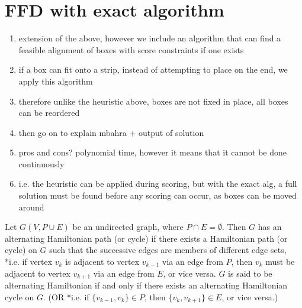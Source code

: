 \documentclass{llncs}
\begin{document}
\section{FFD with exact algorithm}
\begin{enumerate}
	\item extension of the above, however we include an algorithm that can find a feasible alignment of boxes with score constraints if one exists
	\item if a box can fit onto a strip, instead of attempting to place on the end, we apply this algorithm
	\item therefore unlike the heuristic above, boxes are not fixed in place, all boxes can be reordered
	\item then go on to explain mbahra + output of solution
	\item pros and cons? polynomial time, however it means that it cannot be done continuously
	\item i.e. the heuristic can be applied during scoring, but with the exact alg, a full solution must be found before any scoring can occur, as boxes can be moved around
\end{enumerate}

\begin{definition}
	Let $G(V,P\cup E)$ be an undirected graph, where $P \cap E = \emptyset$. Then $G$ has an alternating Hamiltonian path (or cycle) if there exists a Hamiltonian path (or cycle) on $G$ such that the successive edges are members of different edge sets, *i.e. if vertex $v_k$ is adjacent to vertex $v_{k-1}$ via an edge from $P$, then $v_k$ must be adjacent to vertex $v_{k+1}$ via an edge from $E$, or vice versa. $G$ is said to be alternating Hamiltonian if and only if there exists an alternating Hamiltonian cycle on $G$. (OR *i.e. if $\{v_{k-1}, v_k\} \in P$, then $\{v_k, v_{k+1}\} \in E$, or vice versa.)
\end{definition}
\end{document}
